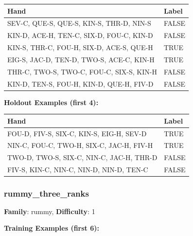 \documentclass[10pt,a4paper]{article}
\begin{document}
\begin{small}
\begin{tabular}{p{8cm}l}
\toprule
Hand & Label \\
\midrule
SEV-C, QUE-S, QUE-S, KIN-S, THR-D, NIN-S & \textcolor{negative}{FALSE} \\
KIN-D, ACE-H, TEN-C, SIX-D, FOU-C, KIN-D & \textcolor{negative}{FALSE} \\
KIN-S, THR-C, FOU-H, SIX-D, ACE-S, QUE-H & \textcolor{positive}{TRUE} \\
EIG-S, JAC-D, TEN-D, TWO-S, ACE-C, KIN-H & \textcolor{positive}{TRUE} \\
THR-C, TWO-S, TWO-C, FOU-C, SIX-S, KIN-H & \textcolor{negative}{FALSE} \\
KIN-D, TEN-S, FOU-H, KIN-D, QUE-H, FIV-D & \textcolor{negative}{FALSE} \\
\bottomrule
\end{tabular}
\end{small}

\textbf{Holdout Examples (first 4):}

\begin{small}
\begin{tabular}{p{8cm}l}
\toprule
Hand & Label \\
\midrule
FOU-D, FIV-S, SIX-C, KIN-S, EIG-H, SEV-D & \textcolor{positive}{TRUE} \\
NIN-C, FOU-C, TWO-H, SIX-C, JAC-H, FIV-H & \textcolor{positive}{TRUE} \\
TWO-D, TWO-S, SIX-C, NIN-C, JAC-H, THR-D & \textcolor{negative}{FALSE} \\
FIV-S, KIN-C, NIN-C, NIN-D, NIN-D, TEN-C & \textcolor{negative}{FALSE} \\
\bottomrule
\end{tabular}
\end{small}

\vspace{0.5cm}

\subsubsection{rummy\_three\_ranks}

\textbf{Family}: rummy, \textbf{Difficulty}: 1

\textbf{Training Examples (first 6):}
\end{document}
